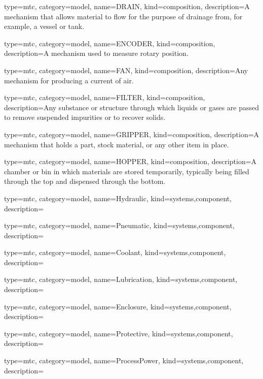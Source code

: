 {
  type=mtc,
  category=model,
  name={DRAIN},
  kind={composition},
  description={A mechanism that allows material to flow for the purpose of drainage from, for example, a vessel or tank.}
}


{
  type=mtc,
  category=model,
  name={ENCODER},
  kind={composition},
  description={A mechanism used to measure rotary position.}
}


{
  type=mtc,
  category=model,
  name={FAN},
  kind={composition},
  description={Any mechanism for producing a current of air.}
}


{
  type=mtc,
  category=model,
  name={FILTER},
  kind={composition},
  description={Any substance or structure through which liquids or gases are passed to remove suspended impurities or to recover solids.}
}


{
  type=mtc,
  category=model,
  name={GRIPPER},
  kind={composition},
  description={A mechanism that holds a part, stock material, or any other item in place.}
}


{
  type=mtc,
  category=model,
  name={HOPPER},
  kind={composition},
  description={A chamber or bin in which materials are stored temporarily, typically being filled through the top and dispensed through the bottom.}
}


{
  type=mtc,
  category=model,
  name={Hydraulic},
  kind={systems,component},
  description={}
}


{
  type=mtc,
  category=model,
  name={Pneumatic},
  kind={systems,component},
  description={}
}


{
  type=mtc,
  category=model,
  name={Coolant},
  kind={systems,component},
  description={}
}


{
  type=mtc,
  category=model,
  name={Lubrication},
  kind={systems,component},
  description={}
}


{
  type=mtc,
  category=model,
  name={Enclosure},
  kind={systems,component},
  description={}
}


{
  type=mtc,
  category=model,
  name={Protective},
  kind={systems,component},
  description={}
}


{
  type=mtc,
  category=model,
  name={ProcessPower},
  kind={systems,component},
  description={}
}


